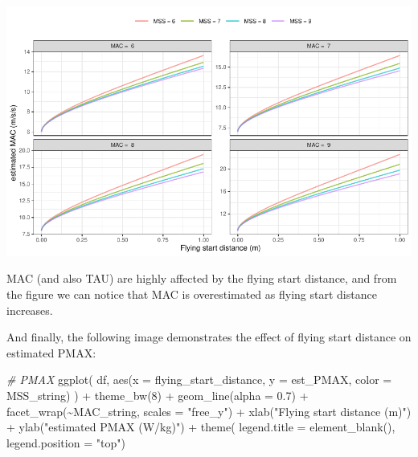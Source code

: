 \documentclass[fleqn,10pt,lineno]{wlpeerj} %
\newenvironment{Shaded}{\begin{snugshade}}{\end{snugshade}}
\newcommand{\AttributeTok}[1]{\textcolor[rgb]{0.77,0.63,0.00}{#1}}
\newcommand{\CommentTok}[1]{\textcolor[rgb]{0.56,0.35,0.01}{\textit{#1}}}
\newcommand{\DecValTok}[1]{\textcolor[rgb]{0.00,0.00,0.81}{#1}}
\newcommand{\FloatTok}[1]{\textcolor[rgb]{0.00,0.00,0.81}{#1}}
\newcommand{\FunctionTok}[1]{\textcolor[rgb]{0.00,0.00,0.00}{#1}}
\newcommand{\NormalTok}[1]{#1}
\newcommand{\SpecialCharTok}[1]{\textcolor[rgb]{0.00,0.00,0.00}{#1}}
\newcommand{\StringTok}[1]{\textcolor[rgb]{0.31,0.60,0.02}{#1}}
\begin{document}
\begin{center}\includegraphics[width=1\linewidth]{paper_files/figure-latex/unnamed-chunk-35-1} \end{center}

MAC (and also TAU) are highly affected by the flying start distance, and from the figure we can notice that MAC is overestimated as flying start distance increases.

And finally, the following image demonstrates the effect of flying start distance on estimated PMAX:

\begin{Shaded}
\begin{Highlighting}[]
\CommentTok{\# PMAX}
\FunctionTok{ggplot}\NormalTok{(}
\NormalTok{  df,}
  \FunctionTok{aes}\NormalTok{(}\AttributeTok{x =}\NormalTok{ flying\_start\_distance, }\AttributeTok{y =}\NormalTok{ est\_PMAX, }\AttributeTok{color =}\NormalTok{ MSS\_string)}
\NormalTok{) }\SpecialCharTok{+}
  \FunctionTok{theme\_bw}\NormalTok{(}\DecValTok{8}\NormalTok{) }\SpecialCharTok{+}
  \FunctionTok{geom\_line}\NormalTok{(}\AttributeTok{alpha =} \FloatTok{0.7}\NormalTok{) }\SpecialCharTok{+}
  \FunctionTok{facet\_wrap}\NormalTok{(}\SpecialCharTok{\textasciitilde{}}\NormalTok{MAC\_string, }\AttributeTok{scales =} \StringTok{"free\_y"}\NormalTok{) }\SpecialCharTok{+}
  \FunctionTok{xlab}\NormalTok{(}\StringTok{"Flying start distance (m)"}\NormalTok{) }\SpecialCharTok{+}
  \FunctionTok{ylab}\NormalTok{(}\StringTok{"estimated PMAX (W/kg)"}\NormalTok{) }\SpecialCharTok{+}
  \FunctionTok{theme}\NormalTok{(}
    \AttributeTok{legend.title =} \FunctionTok{element\_blank}\NormalTok{(), }
    \AttributeTok{legend.position =} \StringTok{"top"}\NormalTok{)}
\end{Highlighting}
\end{Shaded}
\end{document}
